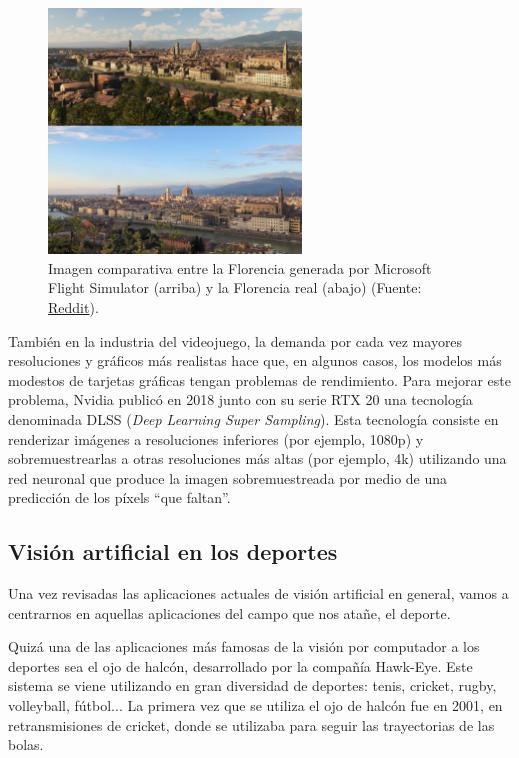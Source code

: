 \begin{figure}
    \centering
    \includegraphics[width=0.6\textwidth]{images/fls2020.png}
    \caption{Imagen comparativa entre la Florencia generada por Microsoft Flight Simulator (arriba) y la Florencia real (abajo) (Fuente: \href{https://www.reddit.com/r/MicrosoftFlightSim/comments/ic559l/photo_of_florence_from_the_piazzale_michelangelo/}{Reddit}).}
    \label{fig:fs2020}
\end{figure}

También en la industria del videojuego, la demanda por cada vez mayores resoluciones y gráficos más realistas hace que, en algunos casos, los modelos más modestos de tarjetas gráficas tengan problemas de rendimiento. Para mejorar este problema, Nvidia publicó en 2018 junto con su serie RTX 20 una tecnología denominada DLSS (\textit{Deep Learning Super Sampling}). Esta tecnología consiste en renderizar imágenes a resoluciones inferiores (por ejemplo, 1080p) y sobremuestrearlas a otras resoluciones más altas (por ejemplo, 4k) utilizando una red neuronal que produce la imagen sobremuestreada por medio de una predicción de los píxels ``que faltan''.

\subsection{Visión artificial en los deportes}
Una vez revisadas las aplicaciones actuales de visión artificial en general, vamos a centrarnos en aquellas aplicaciones del campo que nos atañe, el deporte.

Quizá una de las aplicaciones más famosas de la visión por computador a los deportes sea el ojo de halcón, desarrollado por la compañía Hawk-Eye. Este sistema se viene utilizando en gran diversidad de deportes: tenis, cricket, rugby, volleyball, fútbol... La primera vez que se utiliza el ojo de halcón fue en 2001, en retransmisiones de cricket, donde se utilizaba para seguir las trayectorias de las bolas.

